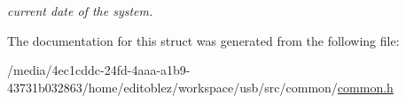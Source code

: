 \begin{DoxyCompactItemize}
\begin{DoxyCompactList}\small\item\em current date of the system. \item\end{DoxyCompactList}\end{DoxyCompactItemize}


The documentation for this struct was generated from the following file:\begin{DoxyCompactItemize}
\item 
/media/4ec1cddc-\/24fd-\/4aaa-\/a1b9-\/43731b032863/home/editoblez/workspace/usb/src/common/\hyperlink{common_8h}{common.h}\end{DoxyCompactItemize}
